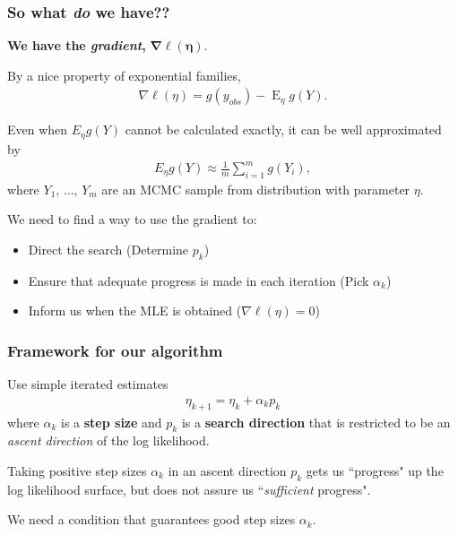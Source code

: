 \documentclass[slidestop,compress, 10pt]{beamer}
\DeclareMathOperator{\E}{E}
\begin{document}
\frame
{
\frametitle{So what \emph{do} we have??}

{\textbf{We have the \emph{gradient},} $\boldsymbol{\nabla \ell(\eta)}$.}
\vspace*{2mm}

By a nice property of exponential families,
\begin{align*}
	\nabla \ell( \eta ) = g(y_{obs}) - \E_{\eta} g(Y).
\end{align*}

\pause
Even when $E_\eta g(Y)$ cannot be calculated exactly, it can be well approximated by
\begin{align*}
E_\eta g(Y) \approx \frac{1}{m}\sum_{i = 1}^m g(Y_i),
\end{align*}
where $Y_1$, $\ldots$, $Y_m$ are an MCMC sample from distribution with parameter $\eta$.
\vspace*{4mm}

\pause
We need to find a way to use the gradient to: 
\vspace*{2mm}
\begin{itemize}
\item Direct the search  (Determine $p_k$)
\vspace*{2mm}

\item Ensure that adequate progress is made in each iteration  (Pick $\alpha_k$)
\vspace*{2mm}

\item Inform us when the MLE is obtained  ($\nabla \ell(\eta) = 0$)
\end{itemize}

}

\frame
{
\frametitle{Framework for our algorithm}
Use simple iterated estimates
\begin{align*}
	\eta_{k+1} = \eta_k + \alpha_k p_k
\end{align*}
where $\alpha_k$ is a \textbf{step size} and  $p_k$ is a \textbf{search direction} that
is restricted to be an \emph{ascent direction} of the log likelihood.
\vspace{3mm}

\pause
Taking positive step sizes $\alpha_k$ in an ascent direction $p_k$ gets us ``progress" up the log 
likelihood surface, but does not assure us 
``\emph{sufficient} progress".
\vspace{3mm}

We need a condition that guarantees good step sizes $\alpha_k$.
}
\end{document}
